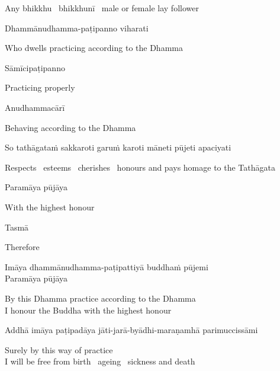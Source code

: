 \begin{english}
  Any bhikkhu \breathmark\ bhikkhunī \breathmark\ male or female lay follower
\end{english}

Dhammānudhamma-paṭipanno viharati

\begin{english}
  Who dwells practicing according to the Dhamma
\end{english}

Sāmīcipaṭipanno

\begin{english}
  Practicing properly
\end{english}

Anudhammacārī

\begin{english}
  Behaving according to the Dhamma
\end{english}

So tathāgataṁ sakkaroti garuṁ karoti māneti pūjeti apaciyati

\begin{english-hang}
  Respects \breathmark\ esteems \breathmark\ cherishes \breathmark\ honours and pays homage to the Tathāgata
\end{english-hang}

Paramāya pūjāya

\begin{english}
  With the highest honour
\end{english}

\suttaRef{[DN 16]}

Tasmā

\begin{english}
  Therefore
\end{english}

Imāya dhammānudhamma-paṭipattiyā buddhaṁ pūjemi\\
Paramāya pūjāya

\begin{english}
  By this Dhamma practice according to the Dhamma\\
  I honour the Buddha with the highest honour
\end{english}

\begin{pali-hang}
  Addhā imāya paṭipadāya jāti-jarā-byādhi-maraṇamhā parimuccissāmi
\end{pali-hang}

\begin{english}
  Surely by this way of practice\\
  I will be free from birth \breathmark\ ageing \breathmark\ sickness and death
\end{english}

